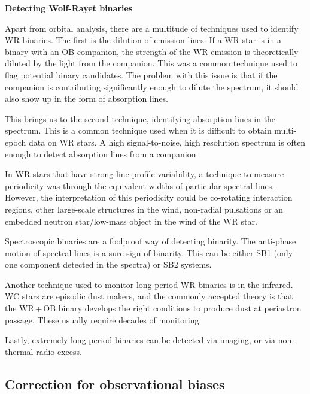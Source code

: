 \textbf{Detecting Wolf-Rayet binaries}

Apart from orbital analysis, there are a multitude of techniques used to identify WR binaries. The first is the dilution of emission lines. If a WR star is in a binary with an OB companion, the strength of the WR emission is theoretically diluted by the light from the companion. This was a common technique used to flag potential binary candidates. The problem with this issue is that if the companion is contributing significantly enough to dilute the spectrum, it should also show up in the form of absorption lines.

This brings us to the second technique, identifying absorption lines in the spectrum. This is a common technique used when it is difficult to obtain multi-epoch data on WR stars. A high signal-to-noise, high resolution spectrum is often enough to detect absorption lines from a companion. 

In WR stars that have strong line-profile variability, a technique to measure periodicity was through the equivalent widths of particular spectral lines. However, the interpretation of this periodicity could be co-rotating interaction regions, other large-scale structures in the wind, non-radial pulsations or an embedded neutron star/low-mass object in the wind of the WR star. 

Spectroscopic binaries are a foolproof way of detecting binarity. The anti-phase motion of spectral lines is a sure sign of binarity. This can be either SB1 (only one component detected in the spectra) or SB2 systems. 

Another technique used to monitor long-period WR binaries is in the infrared. WC stars are episodic dust makers, and the commonly accepted theory is that the WR\,+\,OB binary develops the right conditions to produce dust at periastron passage. These usually require decades of monitoring. 

Lastly, extremely-long period binaries can be detected via imaging, or via non-thermal radio excess. 

\subsection{Correction for observational biases} 

